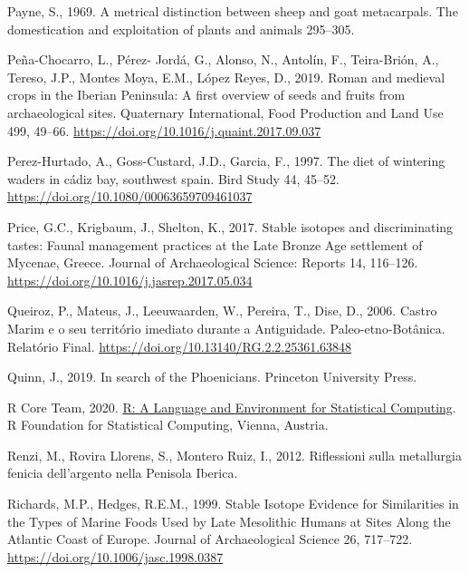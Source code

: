 \documentclass[preprint, 3p, authoryear]{elsarticle} %
\newlength{\cslhangindent}
\newlength{\cslentryspacingunit} %
\newenvironment{CSLReferences}[2] %
 {%
  \setlength{\parindent}{0pt}
  \ifodd #1
  \let\oldpar\par
  \def\par{\hangindent=\cslhangindent\oldpar}
  \fi
  \setlength{\parskip}{#2\cslentryspacingunit}
 }%
 {}
\begin{document}
\begin{CSLReferences}{1}{0}
\leavevmode{}%
Payne, S., 1969. A metrical distinction between sheep and goat metacarpals. The domestication and exploitation of plants and animals 295--305.

\leavevmode{}%
Peña-Chocarro, L., Pérez- Jordá, G., Alonso, N., Antolín, F., Teira-Brión, A., Tereso, J.P., Montes Moya, E.M., López Reyes, D., 2019. Roman and medieval crops in the {Iberian Peninsula}: {A} first overview of seeds and fruits from archaeological sites. Quaternary International, Food {Production} and {Land Use} 499, 49--66. \url{https://doi.org/10.1016/j.quaint.2017.09.037}

\leavevmode{}%
Perez-Hurtado, A., Goss-Custard, J.D., Garcia, F., 1997. The diet of wintering waders in cádiz bay, southwest spain. Bird Study 44, 45--52. \url{https://doi.org/10.1080/00063659709461037}

\leavevmode{}%
Price, G.C., Krigbaum, J., Shelton, K., 2017. Stable isotopes and discriminating tastes: {Faunal} management practices at the {Late Bronze Age} settlement of {Mycenae}, {Greece}. Journal of Archaeological Science: Reports 14, 116--126. \url{https://doi.org/10.1016/j.jasrep.2017.05.034}

\leavevmode{}%
Queiroz, P., Mateus, J., Leeuwaarden, W., Pereira, T., Dise, D., 2006. Castro {Marim} e o seu território imediato durante a {Antiguidade}. {Paleo}-etno-{Botânica}. {Relatório Final}. \url{https://doi.org/10.13140/RG.2.2.25361.63848}

\leavevmode{}%
Quinn, J., 2019. In search of the {Phoenicians}. {Princeton University Press}.

\leavevmode{}%
R Core Team, 2020. \href{https://www.R-project.org/}{R: {A Language} and {Environment} for {Statistical Computing}}. {R Foundation for Statistical Computing}, {Vienna, Austria}.

\leavevmode{}%
Renzi, M., Rovira Llorens, S., Montero Ruiz, I., 2012. Riflessioni sulla metallurgia fenicia dell'argento nella {Penisola Iberica}.

\leavevmode{}%
Richards, M.P., Hedges, R.E.M., 1999. Stable {Isotope Evidence} for {Similarities} in the {Types} of {Marine Foods Used} by {Late Mesolithic Humans} at {Sites Along} the {Atlantic Coast} of {Europe}. Journal of Archaeological Science 26, 717--722. \url{https://doi.org/10.1006/jasc.1998.0387}


\end{CSLReferences}
\end{document}
